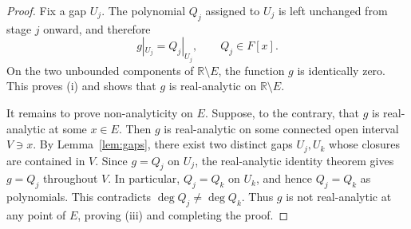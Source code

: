 \documentclass[10pt,a4paper]{amsart}
\newcommand{\R}{\mathbb R}
\begin{document}
\begin{proof}
Fix a gap $U_j$. The polynomial $Q_j$ assigned to $U_j$ is left unchanged from stage $j$ onward,
and therefore
\[
g|_{U_j}=Q_j|_{U_j},
\qquad
Q_j\in F[x].
\]
On the two unbounded components of $\R\setminus E$, the function $g$ is
identically zero. This proves \textup{(i)} and shows that $g$ is
real-analytic on $\R\setminus E$.

It remains to prove non-analyticity on $E$. Suppose, to the contrary,
that $g$ is real-analytic at some $x\in E$. Then $g$ is real-analytic on
some connected open interval $V\ni x$. By Lemma~\ref{lem:gaps}, there
exist two distinct gaps $U_j,U_k$ whose closures are contained in $V$.
Since $g=Q_j$ on $U_j$, the real-analytic identity theorem gives
$g=Q_j$ throughout $V$. In particular, $Q_j=Q_k$ on $U_k$, and hence
$Q_j=Q_k$ as polynomials. This contradicts
$\deg Q_j\neq\deg Q_k$. Thus $g$ is not real-analytic at any point of
$E$, proving \textup{(iii)} and completing the proof.
\end{proof}
\end{document}
